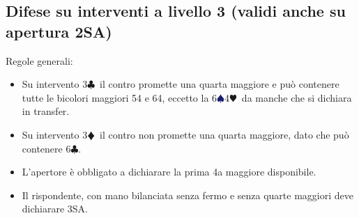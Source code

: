 \documentclass[a4paper,italian]{article}
\newcommand{\BC}{\textcolor{OliveGreen}{$\clubsuit$}}
\newcommand{\BD}{\textcolor{RedOrange}{$\vardiamondsuit$}}
\newcommand{\BH}{\textcolor{Red2}{$\varheartsuit${}}}
\newcommand{\BS}{\textcolor{MidnightBlue}{$\spadesuit${}}}
\begin{document}
\begin{multicols}{2}
    \subsection{Difese su interventi a livello 3 (validi anche su apertura 2SA)}

    Regole generali:
    \begin{itemize}
        \item Su intervento 3\BC\ il contro promette una quarta maggiore e può contenere tutte le bicolori maggiori 54 e 64, eccetto la 6\BS 4\BH\ da manche che si dichiara in transfer.
        \item Su intervento 3\BD\ il contro non promette una quarta maggiore, dato che può contenere 6\BC .
        \item L'apertore è obbligato a dichiarare la prima 4a maggiore disponibile.
        \item Il rispondente, con mano bilanciata senza fermo e senza quarte maggiori deve dichiarare 3SA.


\end{itemize}
\end{multicols}
\end{document}
